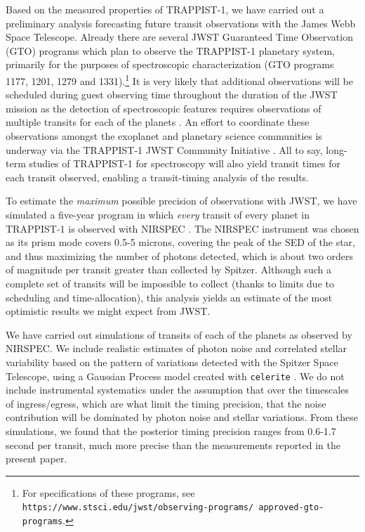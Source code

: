 \documentclass[twocolumn]{aastex63}
\begin{document}
Based on the measured properties of TRAPPIST-1, we have carried out a preliminary analysis forecasting future transit observations with the James Webb Space Telescope. Already there are several JWST Guaranteed Time Observation (GTO) programs which plan to observe the TRAPPIST-1 planetary system, primarily for the purposes of spectroscopic characterization (GTO programs 1177, 1201, 1279 and 1331).\footnote{For specifications of these programs, see \texttt{https://www.stsci.edu/jwst/observing-programs/ approved-gto-programs}.}  It is very likely that additional observations will be scheduled during guest observing  time throughout the duration of the JWST mission as the detection of spectroscopic features requires observations of multiple transits for each of the planets \citep{Morley2017,Barstow2016,Lustig-Yaeger2019,Fauchez2020b}.   An effort to coordinate these observations amongst the exoplanet and planetary science communities is underway via the TRAPPIST-1 JWST Community Initiative \citep{Gillon2020}.  All to say, long-term studies of TRAPPIST-1 for spectroscopy will also yield transit times for each transit observed, enabling a transit-timing analysis of the results.

To estimate the {\it maximum} possible precision of observations with JWST, we have simulated a five-year program in which {\it every} transit of every planet in TRAPPIST-1 is observed with NIRSPEC \citep{Birkmann2016}.   The NIRSPEC instrument was chosen as its prism mode covers 0.5-5 microns, covering the peak of the SED of the star, and thus maximizing the number of photons detected, which is about two orders of magnitude per transit greater than collected by Spitzer. Although such a complete set of transits will be impossible to collect (thanks to limits due to scheduling and time-allocation), this analysis yields an estimate of the most optimistic results we might expect from JWST.

We have carried out simulations of transits of each of the planets as observed by NIRSPEC.  We include realistic estimates of photon noise and correlated stellar variability based on the pattern of variations detected with the Spitzer Space Telescope, using a Gaussian Process model created with \texttt{celerite} \citep{ForemanMackey2017}.  We do not include instrumental systematics under the assumption that over the timescales of ingress/egress, which are what limit the timing precision, that the noise contribution will be dominated by photon noise and stellar variations.
From these simulations, we
found that the posterior timing precision ranges from 0.6-1.7 second per transit, much more precise than the measurements reported in the present paper.
\end{document}

